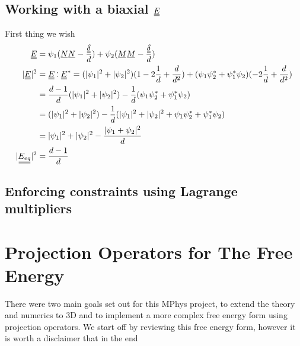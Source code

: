\documentclass[12pt]{article}
\newcommand{\suf}[2]{\stackunder[0.5pt]{\stackunder[1pt]{\ensuremath{#1}}{\rule{\widthof{\ensuremath{#2}}*\real{0.9}}{.1ex}}}{}}
\newcommand{\duf}[2]{\stackunder[0.5pt]{\stackunder[0.8pt]{\stackunder[1pt]{\ensuremath{#1}}{\rule{\widthof{\ensuremath{#2}}*\real{0.9}}{.1ex}}}{\rule{\widthof{\ensuremath{#2}}*\real{0.9}}{.1ex}}}{}}
\newcommand{\su}[1]{\suf{#1}{#1}}
\newcommand{\du}[1]{\duf{#1}{#1}}
\newcommand{\NN}{\ensuremath{\su{N}}}
\newcommand{\MM}{\ensuremath{\su{M}}}
\newcommand{\EE}{\ensuremath{\du{E}}}
\newcommand{\dudelta}{\ensuremath{\du{\delta}}}
\newcommand{\onedot}{$\mathsurround0pt\ldotp$}
\newcommand{\cddot}{\mathbin{
    \vcenter{\baselineskip1ex \vspace{-0.1ex}\hbox{\onedot}\hbox{\onedot}}
}}
\begin{document}

    \subsection{Working with a biaxial \EE}
    First thing we wish
    \begin{align}
        \du{E} &= \psi_1 (\su{N}\su{N} - \frac{\dudelta}{d}) + \psi_2 (\su{M}\su{M} - \frac{\dudelta}{d}) \\
        |\du{E}|^2 &= \du{E} \cddot \du{E}^* = (|\psi_1|^2 + |\psi_2|^2) (1 - 2 \frac{1}{d} + \frac{d}{d^2}) + (\psi_1\psi_2^* + \psi_1^*\psi_2) (-2\frac{1}{d} + \frac{d}{d^2}) \\
        &= \frac{d-1}{d} (|\psi_1|^2 + |\psi_2|^2) - \frac{1}{d} (\psi_1\psi_2^* + \psi_1^*\psi_2) \\
        &= (|\psi_1|^2 + |\psi_2|^2) - \frac{1}{d} (|\psi_1|^2 + |\psi_2|^2 + \psi_1\psi_2^* + \psi_1^*\psi_2) \\
        &= |\psi_1|^2 + |\psi_2|^2 - \frac{|\psi_1 + \psi_2|^2}{d} \\
        |\du{E_{eq}}|^2 &= \frac{d-1}{d}
    \end{align}

    \subsection{Enforcing constraints using Lagrange multipliers}

\section{Projection Operators for The Free Energy}
    There were two main goals set out for this MPhys project, to extend the theory and numerics to 3D and to implement a more complex free energy form using projection operators.
    We start off by reviewing this free energy form, however it is worth a disclaimer that in the end 
\end{document}
